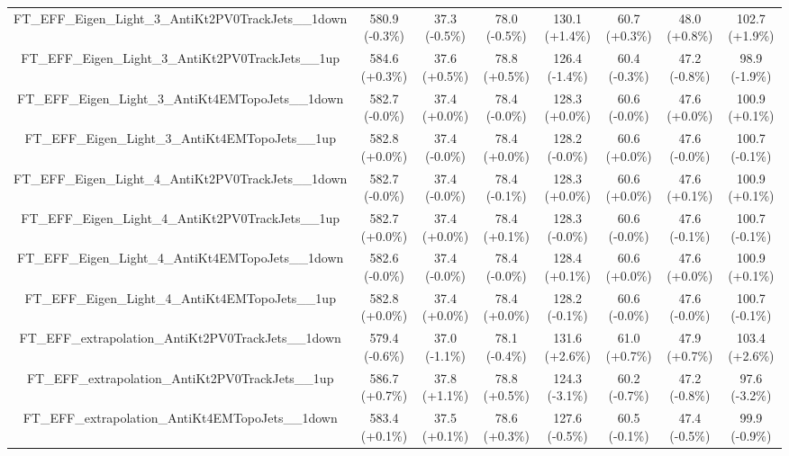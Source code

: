 \begin{table}[htbp!]
\begin{tiny}
\begin{center}
\begin{tabular}{c|c|c|c||c|c|c|c}
FT\_EFF\_Eigen\_Light\_3\_AntiKt2PV0TrackJets\_\_1down       & 580.9     (-0.3\%) & 37.3      (-0.5\%) & 78.0      (-0.5\%) & 130.1     (+1.4\%) & 60.7      (+0.3\%) & 48.0      (+0.8\%) & 102.7     (+1.9\%) \\ 
FT\_EFF\_Eigen\_Light\_3\_AntiKt2PV0TrackJets\_\_1up         & 584.6     (+0.3\%) & 37.6      (+0.5\%) & 78.8      (+0.5\%) & 126.4     (-1.4\%) & 60.4      (-0.3\%) & 47.2      (-0.8\%) & 98.9      (-1.9\%) \\ 
FT\_EFF\_Eigen\_Light\_3\_AntiKt4EMTopoJets\_\_1down         & 582.7     (-0.0\%) & 37.4      (+0.0\%) & 78.4      (-0.0\%) & 128.3     (+0.0\%) & 60.6      (-0.0\%) & 47.6      (+0.0\%) & 100.9     (+0.1\%) \\ 
FT\_EFF\_Eigen\_Light\_3\_AntiKt4EMTopoJets\_\_1up           & 582.8     (+0.0\%) & 37.4      (-0.0\%) & 78.4      (+0.0\%) & 128.2     (-0.0\%) & 60.6      (+0.0\%) & 47.6      (-0.0\%) & 100.7     (-0.1\%) \\ 
FT\_EFF\_Eigen\_Light\_4\_AntiKt2PV0TrackJets\_\_1down       & 582.7     (-0.0\%) & 37.4      (-0.0\%) & 78.4      (-0.1\%) & 128.3     (+0.0\%) & 60.6      (+0.0\%) & 47.6      (+0.1\%) & 100.9     (+0.1\%) \\ 
FT\_EFF\_Eigen\_Light\_4\_AntiKt2PV0TrackJets\_\_1up         & 582.7     (+0.0\%) & 37.4      (+0.0\%) & 78.4      (+0.1\%) & 128.3     (-0.0\%) & 60.6      (-0.0\%) & 47.6      (-0.1\%) & 100.7     (-0.1\%) \\ 
FT\_EFF\_Eigen\_Light\_4\_AntiKt4EMTopoJets\_\_1down         & 582.6     (-0.0\%) & 37.4      (-0.0\%) & 78.4      (-0.0\%) & 128.4     (+0.1\%) & 60.6      (+0.0\%) & 47.6      (+0.0\%) & 100.9     (+0.1\%) \\ 
FT\_EFF\_Eigen\_Light\_4\_AntiKt4EMTopoJets\_\_1up           & 582.8     (+0.0\%) & 37.4      (+0.0\%) & 78.4      (+0.0\%) & 128.2     (-0.1\%) & 60.6      (-0.0\%) & 47.6      (-0.0\%) & 100.7     (-0.1\%) \\ 
FT\_EFF\_extrapolation\_AntiKt2PV0TrackJets\_\_1down         & 579.4     (-0.6\%) & 37.0      (-1.1\%) & 78.1      (-0.4\%) & 131.6     (+2.6\%) & 61.0      (+0.7\%) & 47.9      (+0.7\%) & 103.4     (+2.6\%) \\ 
FT\_EFF\_extrapolation\_AntiKt2PV0TrackJets\_\_1up           & 586.7     (+0.7\%) & 37.8      (+1.1\%) & 78.8      (+0.5\%) & 124.3     (-3.1\%) & 60.2      (-0.7\%) & 47.2      (-0.8\%) & 97.6      (-3.2\%) \\ 
FT\_EFF\_extrapolation\_AntiKt4EMTopoJets\_\_1down           & 583.4     (+0.1\%) & 37.5      (+0.1\%) & 78.6      (+0.3\%) & 127.6     (-0.5\%) & 60.5      (-0.1\%) & 47.4      (-0.5\%) & 99.9      (-0.9\%) \\ 

\end{tabular}
\end{center}
\end{tiny}
\end{table}
